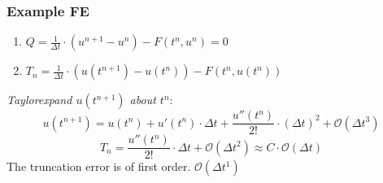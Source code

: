     \subsubsection{Example FE}
        { %
            \vspace{0.5em}
                
                    \begin{enumerate}
                        \item $Q = \frac{1}{\Delta t} \cdot \left( u^{n+1} - u^{n}  \right) - F(t^n,u^n) = 0$
                        \item $T_n = \frac{1}{\Delta t} \cdot \left( u(t^{n+1}) - u(t^{n})  \right) - F(t^n,u(t^n))$
                \end{enumerate}
               {\small \textit{Taylorexpand $u(t^{n+1})$ about $t^n$}:
                $$
                    u(t^{n+1}) = u(t^n) + u'(t^n) \cdot \Delta t + \frac{u''(t^n)}{2!} \cdot (\Delta t)^2 + \mathcal{O}(\Delta t ^3)
                $$}
                $$
                    T_n = \frac{u''(t^n)}{2!} \cdot \Delta t + \mathcal{O}(\Delta t ^2) \approx C \cdot \mathcal{O}(\Delta t)
                $$
                The truncation error is of first order. $\mathcal{O}(\Delta t^1)$
        }